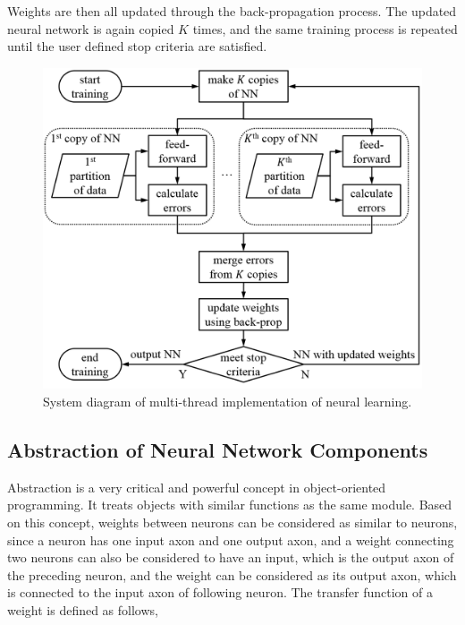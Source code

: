\documentclass[procedia]{easychair}
\begin{document}
Weights are then all updated through the back-propagation process.  The updated neural network is again copied $K$ times, and the same training process is repeated until the user defined stop criteria are satisfied.

\begin{figure}[tb]
    \begin{centering}
        \includegraphics[scale=0.5]{../pic/parallelization.png}
        \caption{System diagram of multi-thread implementation of neural learning.}
    \label{fig:parallelization}
	\end{centering}
\end{figure}

\subsection{Abstraction of Neural Network Components}

Abstraction is a very critical and powerful concept in object-oriented programming.  It treats objects with similar functions as the same module.  Based on this concept, weights between neurons can be considered as similar to neurons, since a neuron has one input axon and one output axon, and a weight connecting two neurons can also be considered to have an input, which is the output axon of the preceding neuron, and the weight can be considered as its output axon, which is connected to the input axon of following neuron.  The transfer function of a weight is defined as follows,
\end{document}
